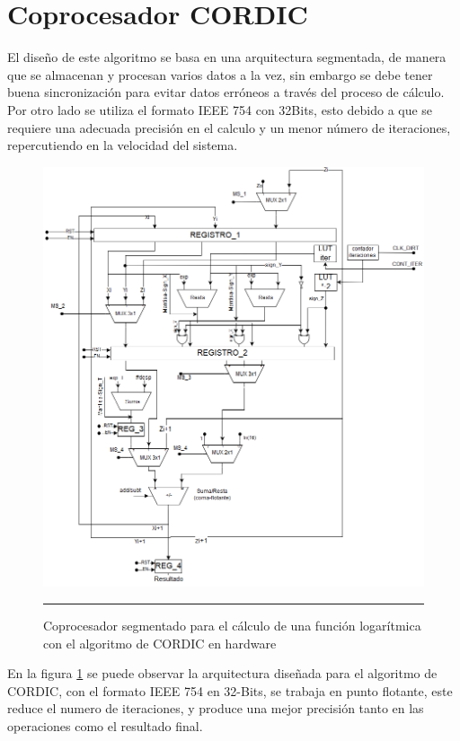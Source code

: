\section{Coprocesador CORDIC}
El diseño de este algoritmo se basa en una arquitectura segmentada, de manera que se almacenan y procesan varios datos a la vez, sin embargo se debe tener buena sincronización para evitar datos erróneos a través del proceso de cálculo. Por otro lado se utiliza el formato IEEE 754 con 32Bits, esto debido a que se requiere una adecuada precisión en el calculo y un menor número de iteraciones, repercutiendo en la velocidad del sistema. 

\begin{figure}[H]
  \centering
    \includegraphics[scale=0.04]{./CORDICLN.png}
    \rule{35em}{0.5pt}
  \caption[Coprocesador segmentado para el cálculo de una función logarítmica con el algoritmo de CORDIC en hardware]{Coprocesador segmentado para el cálculo de una función logarítmica con el algoritmo de CORDIC en hardware  }
  \label{fig:CORDICLN}
\end{figure}

En la figura \ref{fig:CORDICLN} se puede observar la arquitectura diseñada para el algoritmo de CORDIC, con el formato IEEE 754 en 32-Bits, se trabaja en punto flotante, este reduce el numero de iteraciones, y produce una mejor precisión tanto en las operaciones como el resultado final. 

